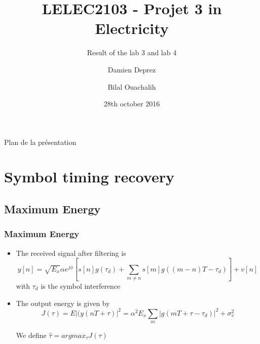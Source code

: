 \documentclass[11pt]{beamer}
\title{LELEC2103 - Projet 3 in Electricity}
\subtitle[\ldots]{Result of the lab 3 and lab 4}
\author[D. Deprez\and B. Ouachalih]{Damien Deprez\and Bilal Ouachalih}
\institute{EPL}
\date{28th october 2016}
\begin{document}
{
	\begin{frame}[noframenumbering]
		\titlepage
	\end{frame}
} 

{
	\begin{frame}[noframenumbering]{Plan de la présentation}
		\tableofcontents
	\end{frame}
}

\section{Symbol timing recovery}

\subsection{Maximum Energy}

\begin{frame}
\frametitle{Maximum Energy}

\begin{itemize}
\item The received signal after filtering is 
\begin{equation}
y[n] = \sqrt{E_x}\alpha e^{j\phi} [s[n]g(\tau_d)+\sum_{m \neq n} s[m] g((m-n)T-\tau_d)]+ v[n]
\end{equation}
with $\tau_d$ is the symbol interference

\item The output energy is given by
\begin{equation}
J(\tau) = E|(y(nT+\tau)|^2= \alpha^2 E_x \sum_m |g(mT+\tau-\tau_d)|^2 + \sigma_v ^2
\end{equation}

We define $\hat{\tau}=argmax_{\tau} J(\tau)$

\end{itemize}   

\end{frame}
\end{document}
